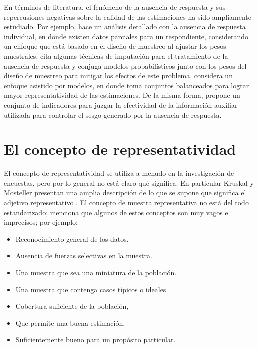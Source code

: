 \documentclass[
  12pt,
]{book}
\providecommand{\tightlist}{%
  \setlength{\itemsep}{0pt}\setlength{\parskip}{0pt}}
\begin{document}
En términos de literatura, el fenómeno de la ausencia de respuesta y sus repercusiones negativas sobre la calidad de las estimaciones ha sido ampliamente estudiado. Por ejemplo, \citet[capítulo 9]{Lumley_2010} hace un análisis detallado con la ausencia de respuesta individual, en donde existen datos parciales para un respondiente, considerando un enfoque que está basado en el diseño de muestreo al ajustar los pesos muestrales. \citet[capítulo 5]{Fuller} cita algunas técnicas de imputación para el tratamiento de la ausencia de respuesta y conjuga modelos probabilísticos junto con los pesos del diseño de muestreo para mitigar los efectos de este problema. \citet{Sar1} considera un enfoque asistido por modelos, en donde toma conjuntos balanceados para lograr mayor representatividad de las estimaciones. De la misma forma, \citet{Sar2} propone un conjunto de indicadores para juzgar la efectividad de la información auxiliar utilizada para controlar el sesgo generado por la ausencia de respuesta.

\hypertarget{el-concepto-de-representatividad}{%
\section{El concepto de representatividad}\label{el-concepto-de-representatividad}}

El concepto de representatividad se utiliza a menudo en la investigación
de encuestas, pero por lo general no está claro qué significa. En particular Kruskal y Mosteller presentan una amplia descripción
de lo que se supone que significa el adjetivo representativo \citep[\citet{KruskalMosteller2}, \citet{KruskalMosteller3}, \citet{KruskalMosteller4}]{KruskalMosteller1}. El concepto de muestra representativa no está del todo estandarizado; \citet{Bethlehem_Cobben_Schouten_2009} menciona que algunos de estos conceptos son muy vagos e imprecisos; por ejemplo:

\begin{itemize}
\tightlist
\item
  Reconocimiento general de los datos.
\item
  Ausencia de fuerzas selectivas en la muestra.
\item
  Una muestra que sea una miniatura de la población.
\item
  Una muestra que contenga casos típicos o ideales.
\item
  Cobertura suficiente de la población,
\item
  Que permite una buena estimación,
\item
  Suficientemente bueno para un propósito particular.
\end{itemize}
\end{document}
